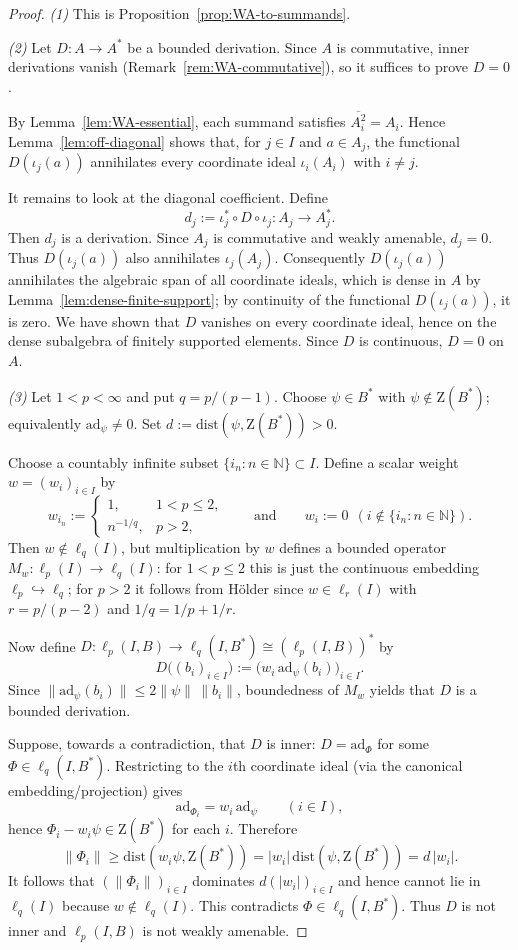 \documentclass[10pt,a4paper]{amsart}
\newcommand{\Zc}{\mathrm{Z}} %
\newcommand{\ad}{\mathrm{ad}}
\renewcommand{\ge}{\geqslant}
\renewcommand{\le}{\leqslant}
\begin{document}
\begin{proof}
\emph{(1)} This is Proposition~\ref{prop:WA-to-summands}.

\smallskip

\emph{(2)} Let $D\colon A\to A^*$ be a bounded derivation.
Since $A$ is commutative, inner derivations vanish (Remark~\ref{rem:WA-commutative}), so it suffices to prove $D=0$.

By Lemma~\ref{lem:WA-essential}, each summand satisfies $\overline{A_i^2}=A_i$.
Hence Lemma~\ref{lem:off-diagonal} shows that, for $j\in I$ and $a\in A_j$, the
functional $D(\iota_j(a))$ annihilates every coordinate ideal $\iota_i(A_i)$ with
$i\neq j$.

It remains to look at the diagonal coefficient.  Define
\[
d_j:=\iota_j^*\circ D\circ \iota_j\colon A_j\to A_j^*.
\]
Then $d_j$ is a derivation.  Since $A_j$ is commutative and weakly amenable, $d_j=0$.
Thus $D(\iota_j(a))$ also annihilates $\iota_j(A_j)$.  Consequently
$D(\iota_j(a))$ annihilates the algebraic span of all coordinate ideals, which is dense in
$A$ by Lemma~\ref{lem:dense-finite-support}; by continuity of the functional
$D(\iota_j(a))$, it is zero.  We have shown that $D$ vanishes on every coordinate ideal,
hence on the dense subalgebra of finitely supported elements.  Since $D$ is continuous,
$D=0$ on $A$.

\smallskip
\emph{(3)} Let $1<p<\infty$ and put $q=p/(p-1)$.
Choose $\psi\in B^*$ with $\psi\notin \Zc(B^*)$; equivalently $\ad_\psi\neq 0$.
Set $d:=\mathrm{dist}(\psi,\Zc(B^*))>0$.

Choose a countably infinite subset $\{i_n:n\in\mathbb N\}\subset I$.
Define a scalar weight $w=(w_i)_{i\in I}$ by
\[
w_{i_n}:=
\begin{cases}
1, & 1<p\le 2,\\[2pt]
n^{-1/q}, & p>2,
\end{cases}
\qquad\text{and}\qquad
w_i:=0\ \ (i\notin \{i_n:n\in\mathbb N\}).
\]
Then $w\notin \ell_q(I)$, but multiplication by $w$ defines a bounded operator
$M_w\colon \ell_p(I)\to \ell_q(I)$:
for $1<p\le 2$ this is just the continuous embedding $\ell_p\hookrightarrow \ell_q$;
for $p>2$ it follows from H\"older since $w\in \ell_r(I)$ with $r=p/(p-2)$ and $1/q=1/p+1/r$.

Now define $D\colon \ell_p(I,B)\to \ell_q(I,B^*)\cong (\ell_p(I,B))^*$ by
\[
D\bigl((b_i)_{i\in I}\bigr):=\bigl(w_i\,\ad_\psi(b_i)\bigr)_{i\in I}.
\]
Since $\|\ad_\psi(b_i)\|\le 2\|\psi\|\,\|b_i\|$, boundedness of $M_w$ yields that $D$ is a bounded derivation.

Suppose, towards a contradiction, that $D$ is inner: $D=\ad_\Phi$ for some $\Phi\in \ell_q(I,B^*)$.
Restricting to the $i$th coordinate ideal (via the canonical embedding/projection) gives
\[
\ad_{\Phi_i}=w_i\,\ad_\psi\qquad (i\in I),
\]
hence $\Phi_i-w_i\psi\in \Zc(B^*)$ for each $i$.
Therefore
\[
\|\Phi_i\|\ge \mathrm{dist}(w_i\psi,\Zc(B^*))=|w_i|\,\mathrm{dist}(\psi,\Zc(B^*))=d\,|w_i|.
\]
It follows that $(\|\Phi_i\|)_{i\in I}$ dominates $d(|w_i|)_{i\in I}$ and hence cannot lie in $\ell_q(I)$ because $w\notin\ell_q(I)$.
This contradicts $\Phi\in\ell_q(I,B^*)$. Thus $D$ is not inner and $\ell_p(I,B)$ is not weakly amenable.
\end{proof}
\end{document}
